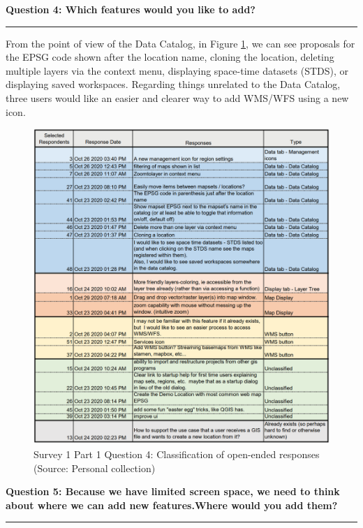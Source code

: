 \documentclass[a4paper,10pt,twoside]{article}
\begin{document}
\newpage
\noindent \textbf{Question 4: Which features would you like to add?}
\par\noindent\rule{\textwidth}{0.4pt}

\noindent From the point of view of the Data Catalog, in Figure
\ref{fig:survey1_part1_question4_open_ended}, we can see proposals for
the EPSG code shown after the location name, cloning the location,
deleting multiple layers via the context menu, displaying space-time
datasets (STDS), or displaying saved workspaces. Regarding things
unrelated to the Data Catalog, three users would like an easier and
clearer way to add WMS/WFS using a new icon.

\begin{figure}[hbt!] 
\begin{center}
\includegraphics[width=15.5cm]{../surveys/analyzed_data/survey1_part1_question4_open_ended.png} 
\caption[Survey 1 Part 1 Question 4: Classification of open-ended responses]{Survey 1 Part 1 Question 4: Classification of open-ended responses (Source: Personal collection)}
\label{fig:survey1_part1_question4_open_ended}
\end{center}
\end{figure}

\newpage
\noindent \textbf{Question 5: Because we have limited screen space, we need to think about where we can add new features.Where would you add them?}
\par\noindent\rule{\textwidth}{0.4pt}
\end{document}
